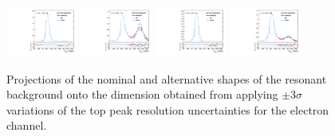 \begin{figure}[htbp]
  \centering
  \includegraphics[width=0.21\textwidth]{fig/analysisAppendix/systs_res_e_HP_nobb_LDy_resTopY_ProjY.pdf}
  \includegraphics[width=0.21\textwidth]{fig/analysisAppendix/systs_res_e_LP_nobb_LDy_resTopY_ProjY.pdf}
  \includegraphics[width=0.21\textwidth]{fig/analysisAppendix/systs_res_e_HP_nobb_HDy_resTopY_ProjY.pdf}
  \includegraphics[width=0.21\textwidth]{fig/analysisAppendix/systs_res_e_LP_nobb_HDy_resTopY_ProjY.pdf}\\
  \caption{
    Projections of the nominal and alternative shapes of the resonant background onto the \MJ dimension obtained from applying $\pm3\sigma$ variations of the top peak resolution uncertainties for the electron channel.
  }
  \label{fig:systResMJ_resTopY}
\end{figure}

